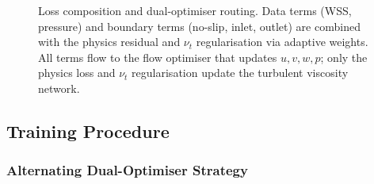 \documentclass[11pt,a4paper]{article}
\begin{document}
\begin{figure}[t]
{
}
\caption{Loss composition and dual-optimiser routing. Data terms (WSS, pressure) and boundary terms (no-slip, inlet, outlet) are combined with the physics residual and $\nu_t$ regularisation via adaptive weights. All terms flow to the flow optimiser that updates $u,v,w,p$; only the physics loss and $\nu_t$ regularisation update the turbulent viscosity network.}
\label{fig:loss_schematic}
\end{figure}

\subsection{Training Procedure}
\label{sec:training}

\subsubsection{Alternating Dual-Optimiser Strategy}
\end{document}
